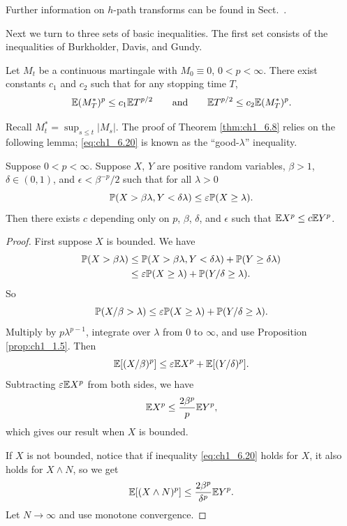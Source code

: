 Further information on $h$-path transforms can be found in Sect.\ .



Next we turn to three sets of basic inequalities. The first set consists of the inequalities of Burkholder, Davis, and Gundy.

\begin{theorem}\label{thm:ch1_6.8}
Let $M_t$ be a continuous martingale with $M_0 \equiv 0$, $0 < p < \infty$. There exist constants $c_1$ and $c_2$ such that for any stopping time $T$,
\[
    \E(M_T^*)^p \leq c_1\E T^{p/2} \qquad \text{and} \qquad \E T^{p/2} \leq c_2\E(M_T^*)^p.
\]
\end{theorem}

Recall $M_t^* = \sup_{s\leq t} |M_s|$. The proof of Theorem \ref{thm:ch1_6.8} relies on the following lemma; \eqref{eq:ch1_6.20} is known as the ``good-$\lambda$'' inequality.

\begin{lemma}\label{lem:ch1_6.9}
Suppose $0 < p < \infty$. Suppose $X$, $Y$ are positive random variables, $\beta > 1$, $\delta \in (0,1)$, and $\epsilon < \beta^{-p}/2$ such that for all $\lambda > 0$
\begin{equation}\label{eq:ch1_6.20}
    \P(X > \beta\lambda, Y < \delta\lambda) \leq \epsilon\P(X \geq \lambda).
\end{equation}
Then there exists $c$ depending only on $p$, $\beta$, $\delta$, and $\epsilon$ such that $\E X^p \leq c\E Y^p$.
\end{lemma}

\begin{proof}
First suppose $X$ is bounded. We have
\begin{align*}
    \P(X > \beta\lambda) &\leq \P(X > \beta\lambda, Y < \delta\lambda) + \P(Y \geq \delta\lambda) \\
    &\leq \epsilon\P(X \geq \lambda) + \P(Y/\delta \geq \lambda).
\end{align*}
So
\[
    \P(X/\beta > \lambda) \leq \epsilon\P(X \geq \lambda) + \P(Y/\delta \geq \lambda).
\]
Multiply by $p\lambda^{p-1}$, integrate over $\lambda$ from 0 to $\infty$, and use Proposition \ref{prop:ch1_1.5}. Then
\mpagebreak
\[
    \E[(X/\beta)^p] \leq \epsilon\E X^p + \E[(Y/\delta)^p].
\]
Subtracting $\epsilon\E X^p$ from both sides, we have
\[
    \E X^p \leq \frac{2\beta^p}{p} \E Y^p,
\]
which gives our result when $X$ is bounded.

If $X$ is not bounded, notice that if inequality \eqref{eq:ch1_6.20} holds for $X$, it also holds for $X \wedge N$, so we get
\[
    \E[(X \wedge N)^p] \leq \frac{2\beta^p}{\delta^p} \E Y^p.
\]
Let $N \to \infty$ and use monotone convergence.
\end{proof}

